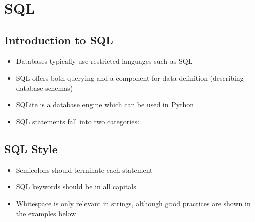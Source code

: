 \documentclass[a4paper]{article}
\begin{document}
\section{SQL}
\subsection{Introduction to SQL}
\begin{itemize}
    \item Databases typically use restricted languages such as SQL
    \item SQL offers both querying and a component for data-definition (describing database schemas)
    \item SQLite is a database engine which can be used in Python
    \item SQL statements fall into two categories:
\end{itemize}

\subsection{SQL Style}
\begin{itemize}
    \item Semicolons should terminate each statement
    \item SQL keywords should be in all capitals
    \item Whitespace is only relevant in strings, although good practices are shown in the examples below
\end{itemize}
\end{document}

